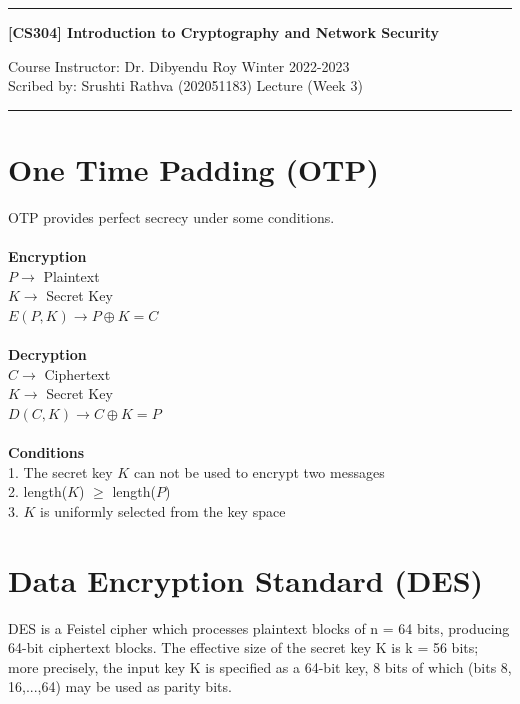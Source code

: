 \documentclass[11pt]{article}
\begin{document}
\noindent
\rule{\textwidth}{1pt}
\begin{center}
{\bf [CS304] Introduction to Cryptography and Network Security}
\end{center}
Course Instructor: Dr. Dibyendu Roy \hfill Winter 2022-2023\\
Scribed by: Srushti Rathva (202051183) \hfill Lecture (Week 3)
\\
\rule{\textwidth}{1pt}

\section*{One Time Padding (OTP)}
OTP provides perfect secrecy under some conditions. \\ \\
\textbf{Encryption} \\
$ P \rightarrow$ Plaintext \\
$ K \rightarrow$ Secret Key \\
$ E(P,K) \rightarrow P \oplus K = C$ \\ \\
\textbf{Decryption} \\
$ C \rightarrow$ Ciphertext \\
$ K \rightarrow$ Secret Key \\
$ D(C,K) \rightarrow C \oplus K = P$ \\ \\
\textbf{Conditions}\\
1. The secret key $K$ can not be used to encrypt two messages \\
2. length($K$) $\geq$ length($P$) \\
3. $K$ is uniformly selected from the key space \\

\section*{Data Encryption Standard (DES)}
DES is a Feistel cipher which processes plaintext blocks of n = 64 bits, producing 64-bit ciphertext blocks. The effective size of the secret key K is k = 56 bits; more precisely, the input key K is specified as a 64-bit key, 8 bits of which (bits 8, 16,...,64) may be used as parity bits.\\ 
\end{document}
